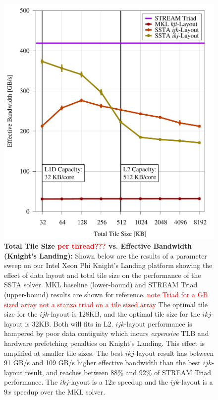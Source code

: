\documentclass{sig-alternate-05-2015}
\newcommand{\fix}[1]{\textcolor{red}{#1}}
\begin{document}
\begin{figure}[!bth]
\begin{minipage}{0.49\textwidth}
{      \label{fig:results:tile_size_hsw}
    }
  \end{minipage}
\end{figure}

\begin{figure}[!h]
    \centering
    \caption{
      \textbf{Total Tile Size \fix{per thread???} vs. Effective Bandwidth (Knight's Landing):}
      Shown below are the results of a parameter sweep on our Intel Xeon Phi
        Knight's Landing platform showing the effect of data layout and total
        tile size on the performance of the SSTA solver.
      MKL baseline (lower-bound) and STREAM Triad (upper-bound) results are shown
        for reference.  \fix{note Triad for a GB sized array not a stanza triad on a tile sized array} 
      The optimal tile size for the \(ijk\)-layout is 128KB, and the optimal
        tile size for the \(ikj\)-layout is 32KB.
      Both will fits in L2.
      \(ijk\)-layout performance is hampered by poor data contiguity which incurs
        \emph{expensive} TLB and hardware prefetching penalties on Knight's
        Landing.
      This effect is amplified at smaller tile sizes.
      The best \(ikj\)-layout result has between 91 GB/s and 109 GB/s higher
        effective bandwidth than the best \(ijk\)-layout result, and reaches
        between 88\% and 92\% of STREAM Triad performance.
      The \(ikj\)-layout is a \(12x\) speedup and the \(ijk\)-layout is a
        \(9x\) speedup over the MKL solver.
    }
    \label{fig:results:tile_size_knl}
    \includegraphics[width=0.95\columnwidth]{figures/post_tsb_tw_sweep_full_matrix_double_precision_production_carl_knl_7210_09_02_2016_64pus.pdf}

\end{figure}
\end{document}
